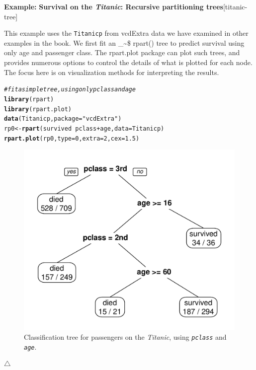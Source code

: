\documentclass{article}
\makeatletter
\newcommand{\hlnum}[1]{\textcolor[rgb]{0.686,0.059,0.569}{#1}}%
\newcommand{\hlstr}[1]{\textcolor[rgb]{0.192,0.494,0.8}{#1}}%
\newcommand{\hlcom}[1]{\textcolor[rgb]{0.678,0.584,0.686}{\textit{#1}}}%
\newcommand{\hlopt}[1]{\textcolor[rgb]{0,0,0}{#1}}%
\newcommand{\hlstd}[1]{\textcolor[rgb]{0.345,0.345,0.345}{#1}}%
\newcommand{\hlkwb}[1]{\textcolor[rgb]{0.69,0.353,0.396}{#1}}%
\newcommand{\hlkwc}[1]{\textcolor[rgb]{0.333,0.667,0.333}{#1}}%
\newcommand{\hlkwd}[1]{\textcolor[rgb]{0.737,0.353,0.396}{\textbf{#1}}}%
\newenvironment{kframe}{%
 \def\at@end@of@kframe{}%
 \ifinner\ifhmode%
  \def\at@end@of@kframe{\end{minipage}}%
  \begin{minipage}{\columnwidth}%
 \fi\fi%
 \def\FrameCommand##1{\hskip\@totalleftmargin \hskip-\fboxsep
 \colorbox{shadecolor}{##1}\hskip-\fboxsep
     \hskip-\linewidth \hskip-\@totalleftmargin \hskip\columnwidth}%
 \MakeFramed {\advance\hsize-\width
   \@totalleftmargin\z@ \linewidth\hsize
   \@setminipage}}%
 {\par\unskip\endMakeFramed%
 \at@end@of@kframe}
\newenvironment{knitrout}{}{} %
\newcommand{\var}[1]{\textit{\texttt{#1}}}
\newcommand{\data}[1]{\texttt{#1}}
\newcommand\code{\bgroup\@makeother\_\@makeother\~\@makeother\$\@codex}
\def\@codex#1{{\normalfont\ttfamily\hyphenchar\font=-1 #1}\egroup}
\newcommand{\func}[1]{\code{#1()}}
\newcommand{\pkg}[1]{\textsf{#1}\nocite{R-#1}}
\newcommand{\Rpackage}[1]{\pkg{#1} package}
\newenvironment{Example}[2][unnamed-example]%
  {\medskip\noindent\textbf{\textsf{Example:}}
   \textbf{#2}\hfill [#1]\par\smallskip
  }
  {\hfill $\triangle$}
\makeatother
\begin{document}
\begin{Example}[titanic-tree]{Survival on the \emph{Titanic}: Recursive partitioning trees}

This example uses the \data{Titanicp} from \pkg{vcdExtra} data we have examined in other examples in the book.
We first fit an \func{rpart} tree to predict survival using only age and passenger class.
The \Rpackage{rpart.plot} can plot such trees, and provides numerous options to 
control the details of what is plotted for each node.  
The focus here is on visualization methods for interpreting the results.

\begin{knitrout}
\color{fgcolor}\begin{kframe}
\begin{alltt}
\hlcom{# fit a simple tree, using only pclass and age}
\hlkwd{library}\hlstd{(rpart)}
\hlkwd{library}\hlstd{(rpart.plot)}
\hlkwd{data}\hlstd{(Titanicp,} \hlkwc{package}\hlstd{=}\hlstr{"vcdExtra"}\hlstd{)}
\hlstd{rp0} \hlkwb{<-} \hlkwd{rpart}\hlstd{(survived} \hlopt{~} \hlstd{pclass} \hlopt{+} \hlstd{age,} \hlkwc{data}\hlstd{=Titanicp)}
\hlkwd{rpart.plot}\hlstd{(rp0,} \hlkwc{type}\hlstd{=}\hlnum{0}\hlstd{,} \hlkwc{extra}\hlstd{=}\hlnum{2}\hlstd{,} \hlkwc{cex}\hlstd{=}\hlnum{1.5}\hlstd{)}
\end{alltt}
\end{kframe}\begin{figure}[hbt!]

{\centering \includegraphics[width=0.55\linewidth]{figure/rp0-1} 

}

\caption[Classification tree for passengers on the \emph{Titanic}, using \var{pclass} and \var{age}]{Classification tree for passengers on the \emph{Titanic}, using \var{pclass} and \var{age}.}\label{fig:rp0}
\end{figure}



\end{knitrout}
\end{Example}
\end{document}
